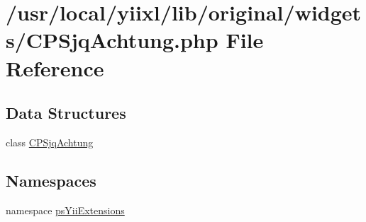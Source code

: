 \hypertarget{CPSjqAchtung_8php}{
\section{/usr/local/yiixl/lib/original/widgets/CPSjqAchtung.php File Reference}
\label{CPSjqAchtung_8php}
}
\subsection*{Data Structures}
\begin{DoxyCompactItemize}
\item 
class \hyperlink{classCPSjqAchtung}{CPSjqAchtung}
\end{DoxyCompactItemize}
\subsection*{Namespaces}
\begin{DoxyCompactItemize}
\item 
namespace \hyperlink{namespacepsYiiExtensions}{psYiiExtensions}
\end{DoxyCompactItemize}
